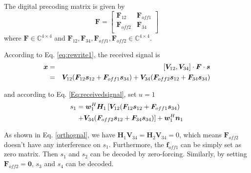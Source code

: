 \documentclass[conference]{IEEEtran}
\begin{document}
The digital precoding matrix is given by 
\begin{equation}
\mathbf{F}=
\begin{bmatrix}
\bm{F}_{12}&\bm{F}_{off1}\\
\bm{F}_{off2} &\bm{F}_{34}\\
\end{bmatrix}
\end{equation}
where $\bm{F}\in \mathbb{C}^{4\times 4}$ and $\bm{F}_{12}, \bm{F}_{34}, \bm{F}_{off1}, \bm{F}_{off2}\in \mathbb{C}^{4\times 4}$.

According to Eq. \eqref{eq:rewrite1}, the received signal is 
\begin{eqnarray}{\label{eq:example1}}
{\bm x} &=& [\bm{V}_{12}, \bm{V}_{34}]\cdot \bm{F}\cdot\bm{s} \nonumber\\
&=& \bm{V}_{12}(\bm{F}_{12}\bm{s}_{12} + \bm{F}_{off1}\bm{s}_{34}) + \bm{V}_{34}(\bm{F}_{off2}\bm{s}_{12} + \bm{F}_{34}\bm{s}_{34})\nonumber\\
\end{eqnarray}

and according to Eq. \eqref{Eq:receivedsignal}, set $u=1$
\begin{align}{\label{eq:example2}}
s_1&=\bm{w}_1^H \bm{H}_1\left[ \bm{V}_{12}(\bm{F}_{12}\bm{s}_{12} +  \bm{F}_{off1}\bm{s}_{34}) \right. \nonumber\\
& \left. + \bm{V}_{34}(\bm{F}_{off2}\bm{s}_{12} + \bm{F}_{34}\bm{s}_{34})\right] +\bm{w}_1^H\bm{n}_1 \nonumber\\
\end{align}

As shown in Eq. \eqref{orthognal}, we have $\bm{H}_1 \bm{V}_{34} = \bm{H}_2 \bm{V}_{34} =0$, which means $\bm{F}_{off2}$ doesn't have any interference on $s_1$. Furthermore, the $\bm{f}_{off1}$ can be simply set as zero matrix. Then $s_1$ and $s_2$ can be decoded by zero-forcing. Similarly, by setting $\bm{F}_{off2} = \bm{0}$, $s_3$ and $s_4$ can be decoded.
\end{document}
